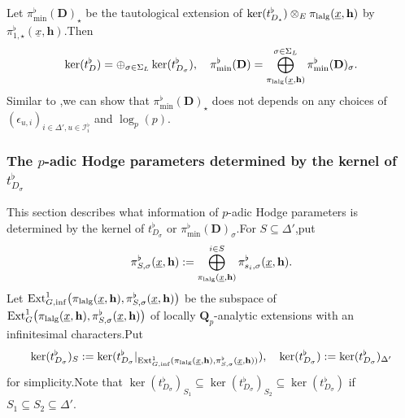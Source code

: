 \documentclass[10pt]{article}
\newcommand{\ext}{{\rm Ext}}
\newcommand{\lalg}{{\rm lalg}}
\newcommand{\Dpik}{{\mathbf{D}}}
\newcommand{\bQ}{{\mathbf{Q}}}
\newcommand{\bh}{{\mathbf{h}}}
\newcommand{\cI}{\mathcal I}
\begin{document}
Let $\pi^{\flat}_{\min}(\Dpik)_{\star}$ be  the tautological extension of $\ker(t^{\flat}_{D_{\star}})\otimes_E\pi_{\lalg}(\underline{x},\bh)$ by $\pi^{\flat}_{1,\star}(\underline{x},\bh)$.\;Then 
\[\ker(t^{\flat}_{D})=\oplus_{\sigma\in \Sigma_L}\ker(t^{\flat}_{D_{\sigma}}),\quad\pi^{\flat}_{\min}(\Dpik)=\bigoplus_{\pi_{\lalg}(\underline{x},\bh)}^{\sigma\in\Sigma_L}\pi^{\flat}_{\min}(\Dpik)_{\sigma}.\]
Similar to \cite[Corollary 2.2.13]{BDcritical25},\;we can show that  $\pi^{\flat}_{\min}(\Dpik)_{\star}$ does not depends on any choices of $(\epsilon_{u,i})_{i\in \Delta',u\in \cI_{i}^{\flat}}$ and $\log_p(p)$.\;




\subsubsection{The $p$-adic Hodge parameters determined by the kernel of  $t^{\flat}_{D_{\sigma}}$}

This section describes what information of $p$-adic Hodge parameters is determined by the kernel of  $t^{\flat}_{D_{\sigma}}$ or   $\pi^{\flat}_{\min}(\Dpik)_{\sigma}$.\;For $S\subseteq \Delta'$,\;put
\[\pi^{\flat}_{S,\sigma}(\underline{x},\bh):=\bigoplus^{i\in S}_{\pi_{\lalg}(\underline{x},\bh)}\pi^{\flat}_{s_i,\sigma}(\underline{x},\bh).\]
Let $\ext^1_{G,\mathrm{inf}}\big(\pi_{\lalg}(\underline{x},\bh),\pi^{\flat}_{S,\sigma}(\underline{x},\bh)\big)$ be the subspace of $\ext^1_{G}\big(\pi_{\lalg}(\underline{x},\bh),\pi^{\flat}_{S,\sigma}(\underline{x},\bh)\big)$ of locally $\bQ_p$-analytic extensions with an infinitesimal characters.\;Put
\[\ker(t^{\flat}_{D_{\sigma}})_S:=\ker(t^{\flat}_{D_{\sigma}}|_{\ext^1_{G,\mathrm{inf}}(\pi_{\lalg}(\underline{x},\bh),\pi^{\flat}_{S,\sigma}(\underline{x},\bh))}),\quad \ker(t^{\flat}_{D_{\sigma}}):=\ker(t^{\flat}_{D_{\sigma}})_{\Delta'}\]
for simplicity.\;Note that $\ker(t^{\flat}_{D_{\sigma}})_{S_1}\subseteq \ker(t^{\flat}_{D_{\sigma}})_{S_2}\subseteq \ker(t^{\flat}_{D_{\sigma}})$ if $S_1\subseteq S_2\subseteq \Delta'$.
\end{document}
